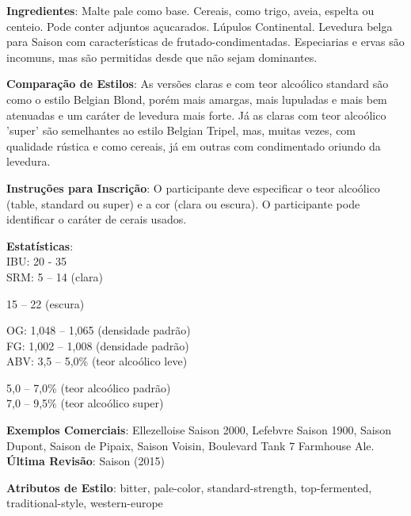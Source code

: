 \textbf{Ingredientes}: Malte pale como base. Cereais, como trigo, aveia, espelta ou centeio. Pode conter adjuntos açucarados. Lúpulos Continental. Levedura belga para Saison com características de frutado-condimentadas. Especiarias e ervas são incomuns, mas são permitidas desde que não sejam dominantes.

\textbf{Comparação de Estilos}: As versões claras e com teor alcoólico standard são como o estilo Belgian Blond, porém mais amargas, mais lupuladas e mais bem atenuadas e um caráter de levedura mais forte. Já as claras com teor alcoólico 'super' são semelhantes ao estilo Belgian Tripel, mas, muitas vezes, com qualidade rústica e como cereais, já em outras com condimentado oriundo da levedura.

\textbf{Instruções para Inscrição}: O participante deve especificar o teor alcoólico (table, standard ou super) e a cor (clara ou escura). O participante pode identificar o caráter de cerais usados.

\textbf{Estatísticas}:\\
IBU: 20 - 35\\
SRM: 5 – 14 (clara)
\begin{adjustwidth}{25pt}{0pt}
15 – 22 (escura)
\end{adjustwidth}
OG: 1,048 – 1,065 (densidade padrão)\\
FG: 1,002 – 1,008 (densidade padrão)\\
ABV: 3,5 – 5,0\% (teor alcoólico leve)
\begin{adjustwidth}{25pt}{0pt}
5,0 – 7,0\% (teor alcoólico padrão)\\
7,0 – 9,5\% (teor alcoólico super)
\end{adjustwidth}

\textbf{Exemplos Comerciais}: Ellezelloise Saison 2000, Lefebvre Saison 1900, Saison Dupont, Saison de Pipaix, Saison Voisin, Boulevard Tank 7 Farmhouse Ale. \\
\textbf{Última Revisão}: Saison (2015)

\textbf{Atributos de Estilo}: bitter, pale-color, standard-strength, top-fermented, traditional-style, western-europe
